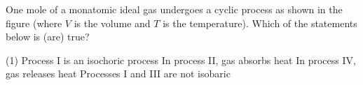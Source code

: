 
\item One mole of a monatomic ideal gas undergoes a cyclic process as shown in the figure (where \( V \) is the volume and \( T \) is the temperature). Which of the statements below is (are) true?
    \begin{center}
    \end{center}
    \begin{tasks}(1)
        \task Process I is an isochoric process
        \task In process II, gas absorbs heat
        \task In process IV, gas releases heat
        \task Processes I and III are not isobaric
    \end{tasks}
